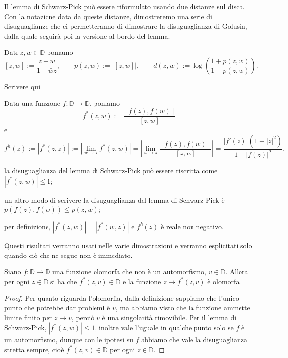 Il lemma di Schwarz-Pick può essere riformulato usando due distanze sul disco. Con la notazione data da queste distanze, dimostreremo una serie di disuguaglianze che ci permetteranno di dimostrare la disuguaglianza di Golusin, dalla quale seguirà poi la versione al bordo del lemma.

\begin{defn}
  Dati $z, w \in \mathbb{D}$ poniamo
  $$[z,w]:=\frac{z-w}{1-\bar{w}z}, \qquad p(z,w):=|[z,w]|, \qquad d(z,w):=\log\left(\frac{1+p(z,w)}{1-p(z,w)}\right).$$
\end{defn}

Scrivere qui 

\begin{defn}
  Data una funzione $f: \mathbb{D} \longrightarrow \mathbb{D}$, poniamo
  $$f^*(z,w):=\frac{[f(z),f(w)]}{[z,w]}$$
  e
  $$f^h(z):=|f^*(z,z)|:=\left|\lim_{w \longrightarrow z} f^*(z,w)\right|=\left|\lim_{w \longrightarrow z} \frac{[f(z),f(w)]}{[z,w]}\right|=\frac{|f'(z)|(1-|z|^2)}{1-|f(z)|^2}.$$
\end{defn}

\begin{oss}
  \begin{nlist}
    \item la disuguaglianza del lemma di Schwarz-Pick può essere riscritta come $|f^*(z,w)| \le 1$;
    \item  un altro modo di scrivere la disuguaglianza del lemma di Schwarz-Pick è $p(f(z),f(w)) \le p(z,w)$;
    \item per definizione, $|f^*(z,w)|=|f^*(w,z)|$ e $f^h(z)$ è reale non negativo.
  \end{nlist}
  Questi risultati verranno usati nelle varie dimostrazioni e verranno esplicitati solo quando ciò che ne segue non è immediato.
\end{oss}

\begin{prop} \label{24}
  Siano $f:\mathbb{D} \longrightarrow \mathbb{D}$ una funzione olomorfa che non è un automorfismo, $v \in \mathbb{D}$. Allora per ogni $z \in \mathbb{D}$ si ha che $f^*(z,v) \in \mathbb{D}$ e la funzione $z \longmapsto f^*(z,v)$ è olomorfa.
\end{prop}

\begin{proof}
  Per quanto riguarda l'olomorfia, dalla definizione sappiamo che l'unico punto che potrebbe dar problemi è $v$, ma abbiamo visto che la funzione ammette limite finito per $z \longrightarrow v$, perciò $v$ è una singolarità rimovibile. Per il lemma di Schwarz-Pick, $|f^*(z,w)| \le 1$, inoltre vale l'uguale in qualche punto solo se $f$ è un automorfismo, dunque con le ipotesi su $f$ abbiamo che vale la disuguaglianza stretta sempre, cioè $f^*(z,v) \in \mathbb{D}$ per ogni $z \in \mathbb{D}$.
\end{proof}

